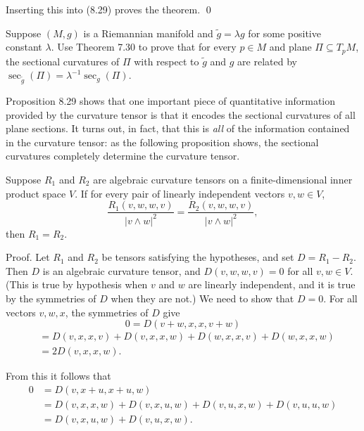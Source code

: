 Inserting this into (8.29) proves the theorem. \qed

\begin{exercise}
\label{exer:metric-scaling-sectional-curvature}
Suppose $(M,g)$ is a Riemannian manifold and $\tilde{g} = \lambda g$ for some positive constant $\lambda$. Use Theorem 7.30 to prove that for every $p \in M$ and plane $\Pi \subseteq T_p M$, the sectional curvatures of $\Pi$ with respect to $\tilde{g}$ and $g$ are related by $\sec_{\tilde{g}}(\Pi) = \lambda^{-1} \sec_g(\Pi)$.
\end{exercise}

Proposition 8.29 shows that one important piece of quantitative information provided by the curvature tensor is that it encodes the sectional curvatures of all plane sections. It turns out, in fact, that this is \emph{all} of the information contained in the curvature tensor: as the following proposition shows, the sectional curvatures completely determine the curvature tensor.

\begin{proposition}
\label{prop:sectional-curvature-determines-curvature-tensor}
Suppose $R_1$ and $R_2$ are algebraic curvature tensors on a finite-dimensional inner product space $V$. If for every pair of linearly independent vectors $v, w \in V$,
\[
\frac{R_1(v, w, w, v)}{|v \wedge w|^2} = \frac{R_2(v, w, w, v)}{|v \wedge w|^2},
\]
then $R_1 = R_2$.
\end{proposition}

Proof. Let $R_1$ and $R_2$ be tensors satisfying the hypotheses, and set $D = R_1 - R_2$. Then $D$ is an algebraic curvature tensor, and $D(v, w, w, v) = 0$ for all $v, w \in V$. (This is true by hypothesis when $v$ and $w$ are linearly independent, and it is true by the symmetries of $D$ when they are not.) We need to show that $D = 0$. For all vectors $v, w, x$, the symmetries of $D$ give
\[
0 = D(v + w, x, x, v + w)
\]
\begin{align*}
&= D(v,x,x,v) + D(v,x,x,w) + D(w,x,x,v) + D(w,x,x,w)\\
&= 2D(v,x,x,w).
\end{align*}

From this it follows that
\begin{align*}
0 &= D(v, x + u, x + u, w)\\
&= D(v,x,x,w) + D(v,x,u,w) + D(v,u,x,w) + D(v,u,u,w)\\
&= D(v,x,u,w) + D(v,u,x,w).
\end{align*}

